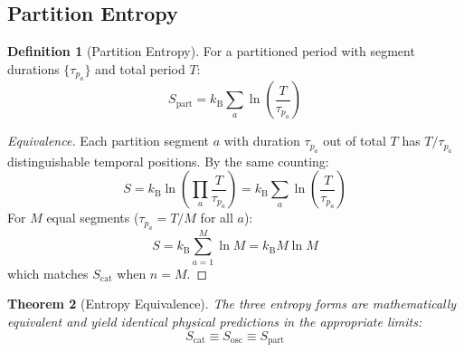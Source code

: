 \documentclass[twocolumn,10pt,a4paper]{article}
\theoremstyle{plain}
\newtheorem{theorem}{Theorem}[section]
\theoremstyle{definition}
\newtheorem{definition}[theorem]{Definition}
\theoremstyle{remark}
\newcommand{\kB}{k_{\mathrm{B}}}
\newcommand{\taup}{\tau_p}
\begin{document}
\subsection{Partition Entropy}

\begin{definition}[Partition Entropy]
For a partitioned period with segment durations $\{\taup_a\}$ and total period $T$:
\begin{equation}
    S_{\mathrm{part}} = \kB \sum_a \ln\!\left(\frac{T}{\taup_a}\right)
\end{equation}
\end{definition}

\begin{proof}[Equivalence]
Each partition segment $a$ with duration $\taup_a$ out of total $T$ has $T/\taup_a$ distinguishable temporal positions. By the same counting:
\begin{equation}
    S = \kB \ln\!\left(\prod_a \frac{T}{\taup_a}\right) = \kB \sum_a \ln\!\left(\frac{T}{\taup_a}\right)
\end{equation}
For $M$ equal segments ($\taup_a = T/M$ for all $a$):
\begin{equation}
    S = \kB \sum_{a=1}^{M} \ln M = \kB M \ln M
\end{equation}
which matches $S_{\mathrm{cat}}$ when $n = M$.
\end{proof}

\begin{theorem}[Entropy Equivalence]
\label{thm:entropy_equiv}
The three entropy forms are mathematically equivalent and yield identical physical predictions in the appropriate limits:
\begin{equation}
    S_{\mathrm{cat}} \equiv S_{\mathrm{osc}} \equiv S_{\mathrm{part}}
\end{equation}
\end{theorem}
\end{document}
